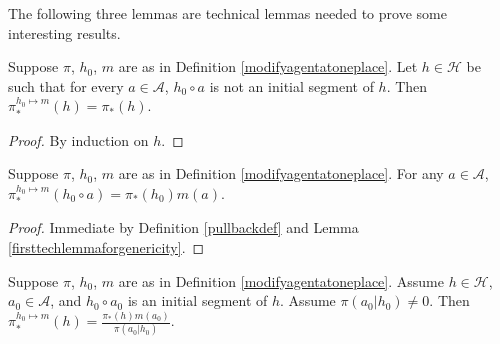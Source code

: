 \documentclass[runningheads]{llncs}
\begin{document}
The following three lemmas are technical lemmas needed to prove
some interesting results.

\begin{lemma}
\label{firsttechlemmaforgenericity}
    Suppose $\pi$, $h_0$, $m$ are as in Definition \ref{modifyagentatoneplace}.
    Let $h\in\mathcal H$ be such that
    for every $a\in\mathcal A$,
    $h_0\circ a$ is not an initial segment of $h$.
    Then $\pi^{h_0\mapsto m}_*(h)=\pi_*(h)$.
\end{lemma}

\begin{proof}
    By induction on $h$.
\end{proof}

\begin{lemma}
\label{thirdtechlemmaforgenericity}
    Suppose $\pi$, $h_0$, $m$ are as in Definition \ref{modifyagentatoneplace}.
    For any $a\in\mathcal A$,
    $\pi^{h_0\mapsto m}_*(h_0\circ a)=\pi_*(h_0)m(a)$.
\end{lemma}

\begin{proof}
    Immediate by Definition \ref{pullbackdef} and Lemma \ref{firsttechlemmaforgenericity}.
\end{proof}

\begin{lemma}
\label{secondtechlemmaforgenericity}
    Suppose $\pi$, $h_0$, $m$ are as in Definition \ref{modifyagentatoneplace}.
    Assume $h\in\mathcal H$, $a_0\in\mathcal A$, and $h_0\circ a_0$ is
    an initial segment of $h$. Assume $\pi(a_0|h_0)\not=0$. Then
    $\pi^{h_0\mapsto m}_*(h) = \frac{\pi_*(h)m(a_0)}{\pi(a_0|h_0)}$.
\end{lemma}
\end{document}
